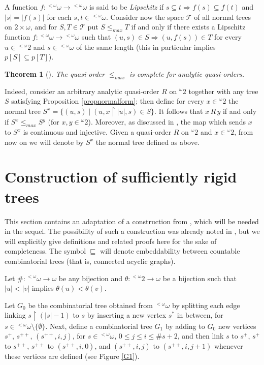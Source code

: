 \documentclass{amsart}
\newtheorem{theorem}{Theorem}[section]
\theoremstyle{definition}
\theoremstyle{remark}
\begin{document}
A function $f \colon {{}^{<\omega}\omega} \to {{}^{<\omega}\omega}$ is said to be \emph{Lipschitz}
if $s \subseteq t {\Rightarrow} f(s) \subseteq f(t)$ and $|s| = |f(s)|$ for
each $s,t \in {{}^{<\omega}\omega}$. Consider now the space $\mathcal{T}$ of all
normal trees on $2 \times \omega$, and for $S,T \in \mathcal{T}$ put
$S \leq_{max} T$ if and only if there exists a Lipschitz function $f
\colon {{}^{<\omega}\omega} \to {{}^{<\omega}\omega}$ such that $(u,s) \in S {\Rightarrow} (u,f(s)) \in T$
for every $u \in {}^{<\omega}2$ and $s \in {{}^{<\omega}\omega}$ of the same length
(this in particular implies $p[S] \subseteq p[T]$).

\begin{theorem}[\cite{louros}]\label{theomax}
The quasi-order $\leq_{max}$ is complete for analytic quasi-orders.
\end{theorem}

Indeed, consider an arbitrary analytic
quasi-order $R$ on ${}^\omega 2$ together with any tree $S$ satisfying
Proposition \ref{propnormalform}; then define for every $x \in
{}^\omega 2$ the normal tree $S^x = \{(u,s) \mid (u,x \restriction
|u|,s) \in S \}$.
It follows that $x\, R\, y$ if and only if $S^x \leq_{max} S^y$ (for $x,y
\in {}^\omega 2$).
Moreover, as discussed in \cite{FriMot}, the map which sends $x$ to $S^x$ is continuous and
injective.
Given a quasi-order $R$ on ${}^\omega 2$ and $x \in
{}^\omega 2$, from
now on we will denote by $S^x$ the normal tree defined as above.

\section{Construction of sufficiently rigid trees}

This section contains an adaptation of a construction from
\cite{FriMot}, which will be needed in the sequel. The possibility of
such a construction was already noted in \cite{FriMot}, but we will
explicitly give definitions and related proofs here for the sake of
completeness.
The symbol $\sqsubseteq $ will denote embeddability between countable
combinatorial trees (that is, connected acyclic graphs).

Let $\# \colon {{}^{<\omega}\omega} \to \omega$ be
any bijection and $\theta \colon {}^{<\omega }2\to\omega $ be a
bijection such that $|u|<|v|$ implies $\theta (u)<\theta (v)$.

Let $G_0$ be the combinatorial tree obtained from $ {{}^{<\omega}\omega} $ by
splitting each edge linking $s \restriction (|s|-1)$ to $s$ by inserting a new
vertex $s^*$ in between, for $s \in {{}^{<\omega}\omega} \setminus \{ \emptyset \}$.
Next, define a combinatorial tree $G_1$ by adding to $G_0$ new
vertices $s^+$, $s^{++}$, $(s^{++},i,j)$, for $s \in {{}^{<\omega}\omega}$, $0 \leq
j \leq i \leq \# s + 2$, and then link
 $s$ to $s^+$, $s^+$ to $s^{++}$, $s^{++}$ to $(s^{++},i,0)$, and
 $(s^{++},i,j)$ to $(s^{++},i,j+1)$ whenever these vertices are
 defined (see Figure \ref{G1}).
\end{document}
